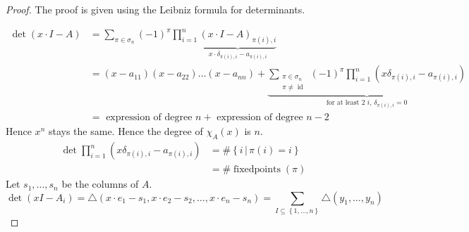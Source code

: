 \documentclass{article}
\numberwithin{lecref}{section}
\newcommand{\set}[1]{\left\{#1\right\}}
\newcommand{\setdef}[2]{\left\{\left.#1\,\right|\,#2\right\}}
\begin{document}
\begin{proof}
  The proof is given using the Leibniz formula for determinants.

  \begin{align*}
    \det(x \cdot I - A) &= \sum_{\pi \in \sigma_n} (-1)^\pi \prod_{i=1}^n \underbrace{(x \cdot I - A)_{\pi(i),i}}_{x \cdot \delta_{\pi(i),i} - a_{\pi(i),i}} \\
      &= (x - a_{11})(x - a_{22}) \dots (x - a_{nn}) +
        \underbrace{
          \sum_{\substack{\pi \in \sigma_n \\ \pi \neq \operatorname{id}}}
          (-1)^\pi \prod_{i=1}^n
          \left(x \delta_{\pi(i),i} - a_{\pi(i),i}\right)
        }_{\text{for at least 2 $i$, $\delta_{\pi(i),i} = 0$}} \\
      &= \text{ expression of degree } n + \text{ expression of degree } n -2
  \end{align*}
  Hence $x^n$ stays the same. Hence the degree of $\chi_A(x)$ is $n$.
  \begin{align*}
    \det{\prod_{i=1}^n (x \delta_{\pi(i),i} - a_{\pi(i),i})} &= \#\setdef{i}{\pi(i) = i} \\
      &= \#\operatorname{fixedpoints}(\pi)
  \end{align*}
  Let $s_1, \dots, s_n$ be the columns of $A$.
  \[ \det(xI - A_i) = \triangle(x\cdot e_1 - s_1, x \cdot e_2 - s_2, \dots, x \cdot e_n - s_n) = \sum_{I \subseteq \set{1, \dots, n}} \triangle(y_1, \dots, y_n) \]


\end{proof}
\end{document}
